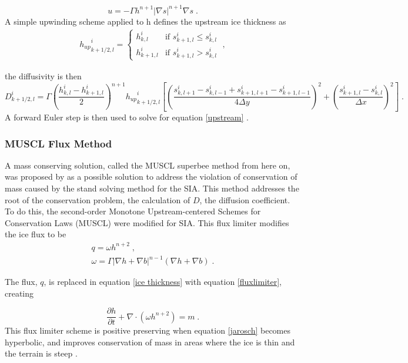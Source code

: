 \documentclass{article}
\begin{document}
\begin{equation}
    u = -\Gamma h^{n+1}|\nabla s|^{n+1}\nabla s \; .
\end{equation}
A simple upwinding scheme applied to h defines the upstream ice thickness as 
\begin{align}
    {h_{up}}^i_{k+1/2,l}= 
	\begin{cases}
    h^i_{k,l}& \text{if } s^i_{k+1,l} \leq s^i_{k,l} \\
    h^i_{k+1,l}              & \text{if }  s^i_{k+1,l} > s^i_{k,l}
	\end{cases} \; ,
\end{align}

the diffusivity is then 
\begin{equation}
D^i_{k+1/2,l} = \Gamma \left( \frac{h^i_{k,l} - h^i_{k+1,l}}{2}\right)^{n+1} {h_{up}}^i_{k+1/2,l}\left[\left( \frac{s^i_{k,l+1}-s^i_{k,l-1}+ s^i_{k+1,l+1}-s^i_{k+1,l-1}}{4 \Delta y}\right)^2+ \left(\frac{s^i_{k+1,l}-s^i_{k,l}}{\Delta x}\right)^2\right] \; .
\end{equation}
A forward Euler step is then used to solve for equation \ref{upstream} \citep{Jarosch2013}. 


\subsubsection{MUSCL Flux Method}
A mass conserving solution, called the MUSCL superbee method from here on, was proposed by \citet{Jarosch2013} as a possible solution to address the violation of conservation of mass caused by the stand solving method for the SIA. This method addresses the root of the conservation problem, the calculation of $D$, the diffusion coefficient. To do this, the second-order Monotone Upstream-centered Schemes for Conservation Laws (MUSCL) were modified for SIA. This flux limiter modifies the ice flux to be 
\begin{subequations}\label{fluxlimiter}
\begin{gather}
q  = \omega h^{n+2}  \; , \\
\omega  = \Gamma | \nabla h + \nabla b |^{n-1}(\nabla h + \nabla b) \; .
\end{gather}
\end{subequations}

The flux, $q$, is replaced in equation \ref{ice thickness} with equation \ref{fluxlimiter}, creating

\begin{equation}\label{jarosch}
\frac{\partial h}{\partial t} + \nabla \cdot (\omega h^{n+2}) = m \; .
\end{equation}
This flux limiter scheme is positive preserving when equation \ref{jarosch} becomes hyperbolic, and improves conservation of mass in areas where the ice is thin and the terrain is steep \citep{Jarosch2013}. 
\end{document}
